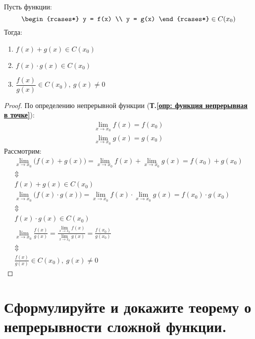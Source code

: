 \begin{theorem}
  Пусть функции: \[
    \begin{rcases*}
      y = f(x) \\
      y = g(x)
    \end{rcases*}
    \in C(x_0) \]
  Тогда:
  \begin{enumerate}
    \item $f(x) + g(x) \in C(x_0)$
    \item $f(x) \cdot g(x) \in C(x_0)$
    \item $\dfrac{f(x)}{g(x)} \in C(x_0),\ g(x) \ne 0$
  \end{enumerate}
\end{theorem}
\begin{proof}
  По определению непрерывной функции (\textbf{Т.\ref{опр: функция непрерывная в точке}}): 
  \begin{gather*} 
    \lim_{x \to x_0} f(x) = f(x_0) \\
    \lim_{x \to x_0} g(x) = g(x_0) 
  \end{gather*}
  Рассмотрим: 
  \begin{gather*}
    \lim_{x \to x_0} \big(f(x) + g(x)\big) = \lim_{x \to x_0} f(x) + \lim_{x \to x_0} g(x) = f(x_0) + g(x_0) \tag{1}\\
    \Updownarrow \\
    f(x) + g(x) \in C(x_0) \\[2ex]
    \lim_{x \to x_0} \big(f(x) \cdot g(x)\big) = \lim_{x \to x_0} f(x) \cdot \lim_{x \to x_0} g(x) = f(x_0) \cdot g(x_0) \tag{2} \\
    \Updownarrow \\
    f(x) \cdot g(x) \in C(x_0) \\[2ex]
    \lim_{x \to x_0} \frac{f(x)}{g(x)} = \frac{\lim\limits_{x \to x_0} f(x)}{\lim\limits_{x \to x_0} g(x)} = \frac{f(x_0)}{g(x_0)} \tag{3} \\
    \Updownarrow \\
    \frac{f(x)}{g(x)} \in C(x_0),\ g(x) \ne 0
  \end{gather*}
\end{proof}

\section{Сформулируйте и докажите теорему о непрерывности сложной функции.}

